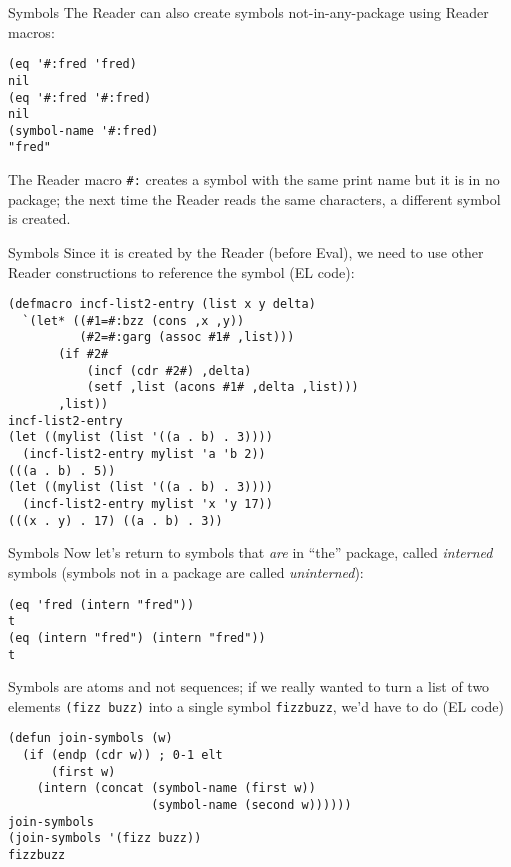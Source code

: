 \documentclass[presentation]{beamer}
\begin{document}
\begin{frame}[fragile]{Symbols}
The Reader can also create symbols not-in-any-package using Reader macros:
\begin{verbatim}
(eq '#:fred 'fred)
nil
(eq '#:fred '#:fred)
nil
(symbol-name '#:fred)
"fred"
\end{verbatim}
The Reader macro \texttt{\#:} creates a symbol with the same print name but it is in no package; the next time the Reader reads the same characters, a different symbol is created.
\end{frame}

\begin{frame}[fragile]{Symbols}
Since it is created by the Reader (before Eval), we need to use other Reader constructions to reference the symbol (EL code):
\begin{verbatim}
(defmacro incf-list2-entry (list x y delta)
  `(let* ((#1=#:bzz (cons ,x ,y))
          (#2=#:garg (assoc #1# ,list)))
       (if #2#
           (incf (cdr #2#) ,delta)
           (setf ,list (acons #1# ,delta ,list)))
       ,list))
incf-list2-entry
(let ((mylist (list '((a . b) . 3))))
  (incf-list2-entry mylist 'a 'b 2))
(((a . b) . 5))
(let ((mylist (list '((a . b) . 3))))
  (incf-list2-entry mylist 'x 'y 17))
(((x . y) . 17) ((a . b) . 3))
\end{verbatim}
\end{frame}

\begin{frame}[fragile]{Symbols}
Now let's return to symbols that \emph{are} in ``the'' package, called \emph{interned} symbols (symbols not in a package are called \emph{uninterned}):
\begin{verbatim}
(eq 'fred (intern "fred"))
t
(eq (intern "fred") (intern "fred"))
t
\end{verbatim}

\medskip
Symbols are atoms and not sequences; if we really wanted to turn a list of two elements \texttt{(fizz buzz)} into a single symbol \texttt{fizzbuzz}, we'd have to do (EL code)
\begin{verbatim}
(defun join-symbols (w)
  (if (endp (cdr w)) ; 0-1 elt
      (first w)
    (intern (concat (symbol-name (first w))
                    (symbol-name (second w))))))
join-symbols
(join-symbols '(fizz buzz))
fizzbuzz
\end{verbatim}
\end{frame}
\end{document}

